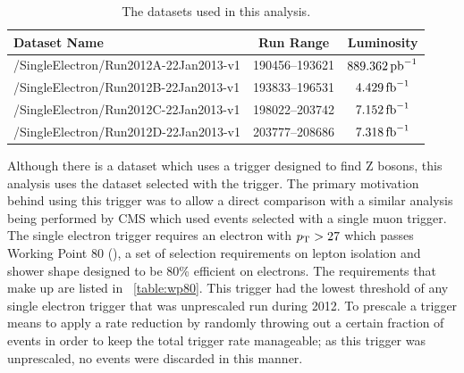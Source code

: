 \begin{table}[h]
\centering
\begin{center}
    \begin{tabular}{ | l | c | c |}
    \hline
    Dataset Name                          & Run Range      & Luminosity       \\ \hline
    /SingleElectron/Run2012A-22Jan2013-v1 & 190456--193621 & $889.362 \mbox{\ensuremath{\,\text{pb}^\text{$-$1}}}$ \\ \hline
    /SingleElectron/Run2012B-22Jan2013-v1 & 193833--196531 & $4.429 \mbox{\ensuremath{\,\text{fb}^\text{$-$1}}}$   \\ \hline
    /SingleElectron/Run2012C-22Jan2013-v1 & 198022--203742 & $7.152 \mbox{\ensuremath{\,\text{fb}^\text{$-$1}}}$   \\ \hline
    /SingleElectron/Run2012D-22Jan2013-v1 & 203777--208686 & $7.318 \mbox{\ensuremath{\,\text{fb}^\text{$-$1}}}$   \\ \hline
    \end{tabular}
\end{center}
\caption{
    The datasets used in this analysis.
}
\label{table:datasets}
\end{table}

Although there is a \DoubleElectron dataset which uses a trigger designed to
find Z bosons, this analysis uses the \SingleElectron dataset selected with the
\SingleElectronTrigger trigger. The primary motivation behind using this
trigger was to allow a direct comparison with a similar \phistar analysis being
performed by CMS which used \Ztomumu events selected with a single muon
trigger. The single electron trigger requires an electron with $p_{\mathrm{T}} > 27$ which
passes Working Point 80 (\WPEighty), a set of selection requirements on lepton
isolation and shower shape designed to be 80\% efficient on electrons. The
requirements that make up \WPEighty are listed in \TAB~\ref{table:wp80}. This
trigger had the lowest \pt threshold of any single electron trigger that was
unprescaled run during 2012. To prescale a trigger means to apply a rate
reduction by randomly throwing out a certain fraction of events in order to
keep the total trigger rate manageable; as this trigger was unprescaled, no
events were discarded in this manner.

